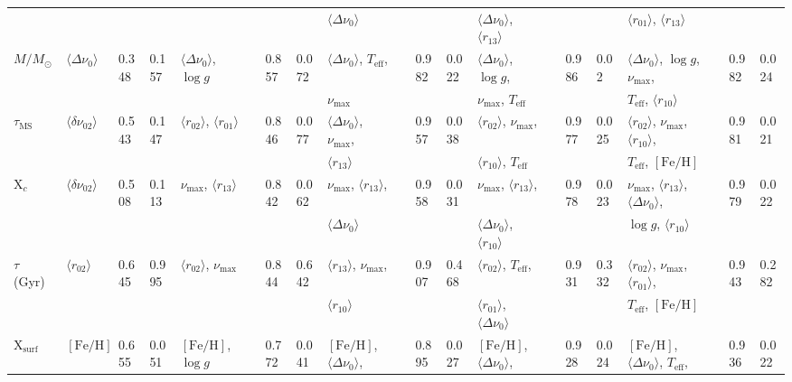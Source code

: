 {\begin{landscape}
\begin{table}
\begin{tabular}{  l | l  l  l | l  l  l  l | l  l  l  l | l  l  l  l | l  l  l  l   }
  &  &  &  &  &  &  &  &  $\langle\Delta\nu_0\rangle$ &  &  &  & $\langle\Delta\nu_0\rangle$, $\langle r_{13}\rangle$ &&  & & $\langle r_{01}\rangle$, $\langle r_{13}\rangle$ &  &  &\\[3pt]
  $M/M_\odot$ & $\langle\Delta\nu_0\rangle$ & 0.348 & 0.157 & $\langle\Delta\nu_0\rangle$, $\log{} g$ && 0.857 & 0.072 & $\langle\Delta\nu_0\rangle$, $T_{\text{eff}}$, && 0.982 & 0.022 & $\langle\Delta\nu_0\rangle$, $\log{} g$, && 0.986 & 0.02 & $\langle\Delta\nu_0\rangle$, $\log{} g$, $\nu_{\max}$, && 0.982 & 0.024\\
  &  &  &  &  &  &  &  &  $\nu_{\max}$ &  &  &  & $\nu_{\max}$, $T_{\text{eff}}$ &&  & & $T_{\text{eff}}$, $\langle r_{10}\rangle$ &  &  &\\[3pt] 
    $\tau_{\text{MS}}$ & $\langle\delta\nu_{02}\rangle$ & 0.543 & 0.147 & $\langle r_{02}\rangle$, $\langle r_{01}\rangle$ && 0.846 & 0.077 & $\langle\Delta\nu_0\rangle$, $\nu_{\max}$, && 0.957 & 0.038 & $\langle r_{02}\rangle$, $\nu_{\max}$, && 0.977 & 0.025 & $\langle r_{02}\rangle$, $\nu_{\max}$, $\langle r_{10}\rangle$, && 0.981 & 0.021\\
  &  &  &  &  &  &  &  &  $\langle r_{13}\rangle$ &  &  &  & $\langle r_{10}\rangle$, $T_{\text{eff}}$ &&  & & $T_{\text{eff}}$, $[\text{Fe/H}]$ &  &  &\\[3pt] 
   X$_c$ & $\langle\delta\nu_{02}\rangle$ & 0.508 & 0.113 & $\nu_{\max}$, $\langle r_{13}\rangle$ && 0.842 & 0.062 & $\nu_{\max}$, $\langle r_{13}\rangle$, && 0.958 & 0.031 & $\nu_{\max}$,  $\langle r_{13}\rangle$,& & 0.978 & 0.023 & $\nu_{\max}$, $\langle r_{13}\rangle$, $\langle\Delta\nu_0\rangle$, && 0.979 & 0.022\\
  &  &  &  &  &  &  &  &  $\langle\Delta\nu_0\rangle$ &  &  &  & $\langle\Delta\nu_0\rangle$, $\langle r_{10}\rangle$ &&  & & $\log{} g$, $\langle r_{10}\rangle$ &  &  &\\[3pt]
  $\tau$ (Gyr)& $\langle r_{02}\rangle$ & 0.645 & 0.995 & $\langle r_{02}\rangle$, $\nu_{\max}$ && 0.844 & 0.642 & $\langle r_{13}\rangle$, $\nu_{\max}$, && 0.907 & 0.468 & $\langle r_{02}\rangle$,  $T_{\text{eff}}$, && 0.931 & 0.332 & $\langle r_{02}\rangle$, $\nu_{\max}$, $\langle r_{01}\rangle$, && 0.943 & 0.282\\
  &  &  &  &  &  &  &  &  $\langle r_{10}\rangle$ &  &  &  & $\langle r_{01}\rangle$, $\langle\Delta\nu_0\rangle$ &&  & & $T_{\text{eff}}$, $[\text{Fe/H}]$ &  &  &\\[3pt] 
   X$_{\text{surf}}$ & $[\text{Fe/H}]$ & 0.655 & 0.051 & $[\text{Fe/H}]$, $\log{} g$ && 0.772 & 0.041 & $[\text{Fe/H}]$, $\langle\Delta\nu_0\rangle$, && 0.895 & 0.027 & $[\text{Fe/H}]$, $\langle\Delta\nu_0\rangle$, && 0.928 & 0.024 & $[\text{Fe/H}]$, $\langle\Delta\nu_0\rangle$, $T_{\text{eff}}$, && 0.936 & 0.022\\

\end{tabular}
\end{table}
\end{landscape}}
